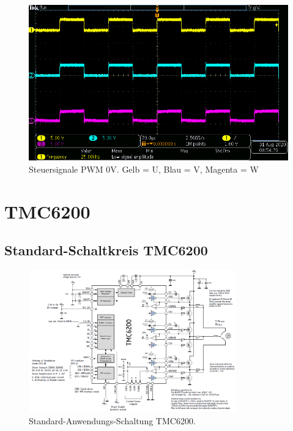 \begin{appendix}
\begin{figure}[h!]
\center
\includegraphics[width = \textwidth]{graphics/TMC4671_Gate_Signal_L}
\caption{Steuersignale PWM 0V. Gelb = U, Blau = V, Magenta = W}
\label{fig:TMC4671_Gate_Signal_L}
\end{figure}

\newpage

\section{TMC6200}\label{Appendix:TMC6200}

\subsection{Standard-Schaltkreis TMC6200}

\begin{figure}[h!]
	\centering
	\includegraphics[width=0.8\textwidth]{graphics/Standard_Application_Cirquit_TMC6200.png}
	\caption{Standard-Anwendungs-Schaltung TMC6200.}
	\label{fig:Schaltung_TMC6200}
\end{figure}


\end{appendix}
